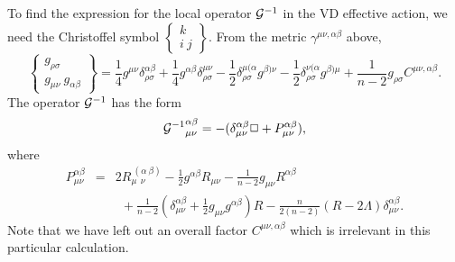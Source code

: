 \documentclass[a4paper,aps,preprint,groupedaddress,showpacs]{revtex4}
\begin{document}
To find the expression for the local operator ${\cal G}^{-1}$ in
the VD effective action, we need the Christoffel symbol
$\left\{ \begin{array}{c} k \\ i\ j \end{array}\right\}$. From
the metric $\gamma^{\mu\nu,\alpha\beta}$ above,
\begin{equation}
\left\{
\begin{array}{c}
g_{\rho\sigma} \\ g_{\mu\nu}\ g_{\alpha\beta}
\end{array}
\right\}=
\frac{1}{4}g^{\mu\nu}\delta^{\alpha\beta}_{\rho\sigma}+
\frac{1}{4}g^{\alpha\beta}\delta^{\mu\nu}_{\rho\sigma}-
\frac{1}{2}\delta^{\mu(\alpha}_{\rho\sigma}g^{\beta)\nu}-
\frac{1}{2}\delta^{\nu(\alpha}_{\rho\sigma}g^{\beta)\mu}+
\frac{1}{n-2}g_{\rho\sigma}C^{\mu\nu,\alpha\beta}.
\end{equation}
The operator ${\cal G}^{-1}$ has the form
\begin{equation}
{{\cal G}^{-1}}^{\alpha\beta}_{\mu\nu}=
-(\delta^{\alpha\beta}_{\mu\nu}\Box+P^{\alpha\beta}_{\mu\nu}),
\end{equation}
where
\begin{eqnarray}
P^{\alpha\beta}_{\mu\nu}&=&
2R^{\ (\alpha\ \beta)}_{\mu\ \ \nu}-
\frac{1}{2}g^{\alpha\beta}R_{\mu\nu}-
\frac{1}{n-2}g_{\mu\nu}R^{\alpha\beta}
\nonumber\\
&&\ \ +\frac{1}{n-2}(\delta^{\alpha\beta}_{\mu\nu}+
\frac{1}{2}g_{\mu\nu}g^{\alpha\beta})R-  
\frac{n}{2(n-2)}(R-2\Lambda)\delta^{\alpha\beta}_{\mu\nu}.
\end{eqnarray}
Note that we have left out an overall factor 
$C^{\mu\nu,\alpha\beta}$ which is irrelevant in this particular calculation.
\end{document}
